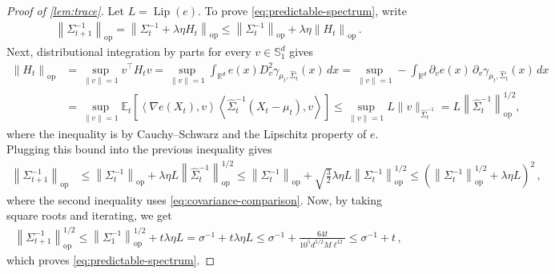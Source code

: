 \documentclass[11pt]{article}
\newcommand{\R}{\mathbb R}
\newcommand{\E}{\mathbb E}
\newcommand{\Lip}{\operatorname{Lip}}
\newcommand{\op}{\mathrm{op}}
\newcommand{\1}{\mathbf 1}
\newcommand{\ip}[2]{\left\langle #1,#2\right\rangle}
\newcommand{\norm}[1]{\left\lVert #1\right\rVert}
\begin{document}
\begin{proof}[Proof of \cref{lem:trace}]
    Let $L=\Lip(e)$.
    To prove \eqref{eq:predictable-spectrum}, write
    \begin{align}
        \norm{\Sigma_{t+1}^{-1}}_{\op}
        =
        \norm{\Sigma_{t}^{-1} + \lambda\eta H_t}_{\op}
        \leq
        \norm{\Sigma_{t}^{-1}}_{\op} + \lambda\eta\norm{H_t}_{\op}\,.
    \end{align}
    Next, distributional integration by parts for every $v\in\mathbb{S}_1^d$ gives
    \begin{align}
        \norm{H_t}_{\op}
         & =
        \sup_{\|v\|=1} v^\top H_t v
        =
        \sup_{\|v\|=1}
        \int_{\R^d}e(x) D^2_v\gamma_{\mu_t,\widehat\Sigma_t}(x)\,dx
        =
        \sup_{\|v\|=1}
        -\int_{\R^d}\partial_ve(x)\,
        \partial_v\gamma_{\mu_t,\widehat\Sigma_t}(x)\,dx
        \\
         & =
        \sup_{\|v\|=1}
        \E_t\left[
            \ip{\nabla e(X_t)}{v}
            \ip{\widehat\Sigma_t^{-1}(X_t-\mu_t)}{v}
            \right]
        \leq
        \sup_{\|v\|=1}
        L \|v\|_{\widehat\Sigma_t^{-1}}
        =
        L \norm{\widehat\Sigma_t^{-1}}_{\op}^{1/2},
        \label{eq:H-quadratic-bound}
    \end{align}
    where the inequality is by Cauchy--Schwarz and the Lipschitz property of $e$.
    Plugging this bound into the previous inequality gives
    \begin{align}
        \norm{\Sigma_{t+1}^{-1}}_{\op}
         & \leq
        \norm{\Sigma_{t}^{-1}}_{\op} + \lambda\eta L \norm{\widehat\Sigma_t^{-1}}_{\op}^{1/2}
        \leq
        \norm{\Sigma_{t}^{-1}}_{\op} + \sqrt{\frac{3}{2}}\lambda\eta L\norm{\Sigma_{t}^{-1}}_{\op}^{1/2}
        \leq
        \left(\norm{\Sigma_{t}^{-1}}_{\op}^{1/2} + \lambda\eta L\right)^2\,,
        \label{eq:predictable-spectrum-bound}
    \end{align}
    where the second inequality uses \eqref{eq:covariance-comparison}.
    Now, by taking square roots and iterating, we get
    \begin{align}
        \norm{\Sigma_{t+1}^{-1}}_{\op}^{1/2}
        \leq
        \norm{\Sigma_1^{-1}}_{\op}^{1/2} + t\lambda\eta L
        = \sigma^{-1}+t\lambda\eta L
        \leq
        \sigma^{-1}
        +\frac{64t}{10^5d^{5/2}M\ell^{12}}
        \leq
        \sigma^{-1} + t\,,
    \end{align}
    which proves \eqref{eq:predictable-spectrum}.



\end{proof}
\end{document}
